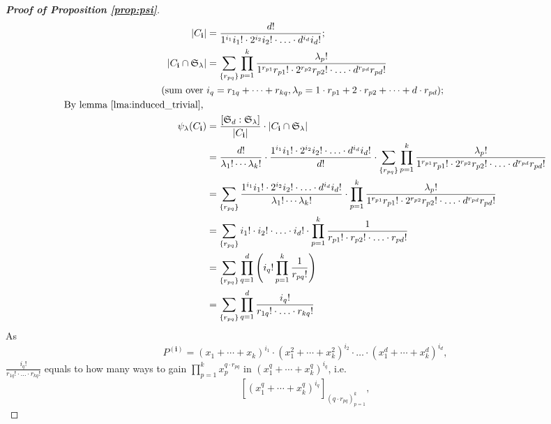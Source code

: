 \documentclass[11pt]{homework}
\begin{document}
\begin{proof}[\normalfont\bfseries Proof of Proposition \ref{prop:psi}]
    \begin{align*}
        |C_\mathbf{i}| &= \frac{d!}{1^{i_1}i_1! \cdot 2^{i_2}i_2! \cdot \ldots \cdot d^{i_d} i_d! }; \\
        |C_\mathbf{i} \cap \mathfrak{S}_\lambda| &= \sum_{\{r_{pq}\}} \prod_{p=1}^k \frac{\lambda_p !}{1^{r_{p1}}r_{p1}! \cdot 2^{r_{p2}}r_{p2}! \cdot \ldots \cdot d^{r_{pd}}r_{pd}!} \\
        (\text{sum over } & i_q = r_{1q} + \cdots + r_{kq}, \lambda_p = 1 \cdot r_{p1} + 2 \cdot r_{p2} + \cdots + d \cdot r_{pd});\\
        \text{By lemma \ref{lma:induced_trivial}, }\\
        \psi_{\lambda}(C_\mathbf{i}) &= \frac{[\mathfrak{S}_d:\mathfrak{S}_\lambda]}{|C_\mathbf{i}|} \cdot |C_\mathbf{i} \cap \mathfrak{S}_\lambda|\\
        &= \frac{d!}{\lambda_1!\cdots\lambda_k!} \cdot \frac{1^{i_1}i_1! \cdot 2^{i_2}i_2! \cdot \ldots \cdot d^{i_d} i_d!}{d!} \cdot \sum_{\{r_{pq}\}} \prod_{p=1}^k \frac{\lambda_p !}{1^{r_{p1}}r_{p1}! \cdot 2^{r_{p2}}r_{p2}! \cdot \ldots \cdot d^{r_{pd}}r_{pd}!} \\
        &= \sum_{\{r_{pq}\}} \frac{1^{i_1}i_1! \cdot 2^{i_2}i_2! \cdot \ldots \cdot d^{i_d} i_d!}{\lambda_1!\cdots\lambda_k!} \cdot  \prod_{p=1}^k \frac{\lambda_p !}{1^{r_{p1}}r_{p1}! \cdot 2^{r_{p2}}r_{p2}! \cdot \ldots \cdot d^{r_{pd}}r_{pd}!}\\
        &= \sum_{\{r_{pq}\}} i_1! \cdot i_2! \cdot \ldots \cdot  i_d! \cdot  \prod_{p=1}^k \frac{1}{r_{p1}! \cdot r_{p2}! \cdot \ldots \cdot r_{pd}!}\\
        &= \sum_{\{r_{pq}\}} \prod_{q=1}^d \left(i_q! \prod_{p=1}^k  \frac{1}{r_{pq}!}\right)\\
        &= \sum_{\{r_{pq}\}} \prod_{q=1}^d \frac{i_q!}{r_{1q}! \cdot \ldots \cdot r_{kq}!}
    \end{align*}
    As 
    \begin{equation*}
        P^{(\mathbf{i})} = (x_1 + \cdots + x_k)^{i_1} \cdot (x_1^2 + \cdots + x_k^2)^{i_2} \cdot \ldots \cdot (x_1^d + \cdots + x_k^d)^{i_d},
    \end{equation*}
    $\frac{i_q!}{r_{1q}! \cdot \ldots \cdot r_{kq}!}$ equals to how many ways to gain $\prod_{p=1}^k x_p^{q \cdot r_{pq}}$ in $(x_1^q + \cdots + x_k^q)^{i_q}$, i.e. 
    \begin{equation*}
        \left[(x_1^q + \cdots + x_k^q)^{i_q}\right]_{(q\cdot r_{pq})_{p=1}^k},

\end{equation*}
\end{proof}
\end{document}

